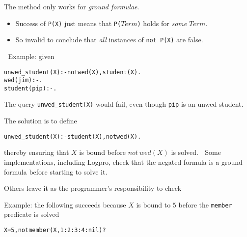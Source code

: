 \documentclass{popl}
\newenvironment{smalltt}{\begin{alltt}\smaller}{\end{alltt}}
\begin{document}
\begin{foil}
The method only works for {\em ground formulae}.
\begin{itemize}
\item Success of {\tt P(X)} just means that {\tt P($Term$)} holds for {\it some} $Term$.
\item So invalid to conclude that {\it all} instances of {\tt not P(X)} are false.
\end{itemize}

Example: given 
\begin{smalltt}
        unwed_student(X) :- not wed(X), student(X).
        wed(jim)     :- .
        student(pip) :- .
\end{smalltt}

The query {\tt unwed\_student(X)} would fail, even though {\tt pip} is an
unwed student.

The solution is to define
\begin{smalltt}
        unwed_student(X) :- student(X), not wed(X).
\end{smalltt}
thereby ensuring that $X$ is bound before $not~wed(X)$ is solved.

Some implementations, including Logpro, check that the negated formula 
is a ground formula before starting to solve it.

Others leave it as the programmer's responsibility to check

Example: the following succeeds because $X$ is bound to $5$ before the {\tt member} 
predicate is solved
\begin{smalltt}
        X=5, not member(X, 1:2:3:4:nil)?
\end{smalltt}
\end{foil}
\end{document}
